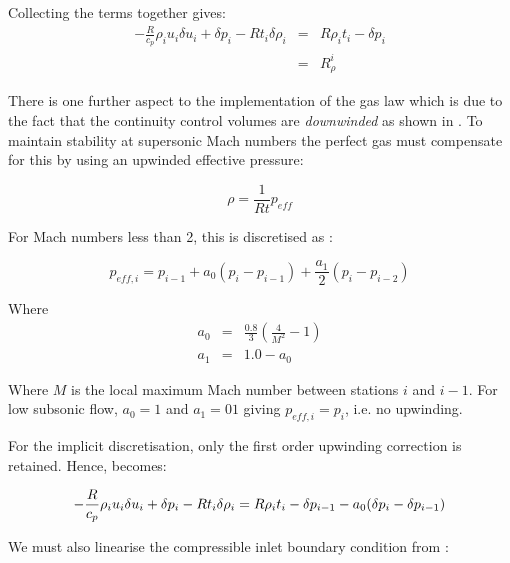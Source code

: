 Collecting the terms together gives:
\begin{equation}
  \begin{array}{rcl}
   -\frac{R}{c_p} \rho_i u_i \delta u_i + \delta p_i - Rt_i \delta \rho_i &=& R\rho_i t_i - \delta p_i \\[8pt]
      &=& R_{\rho}^i
  \end{array}
  \label{eqn-euler-1d-disc5}
\end{equation}

There is one further aspect to the implementation of the gas law which is due to the fact
that the continuity control volumes are {\it downwinded} as shown in .
To maintain stability at supersonic Mach numbers the perfect gas must compensate for this by
using an upwinded effective pressure:

\begin{equation}
    \rho = \frac{1}{Rt} p_{eff}
  \label{eqn-peff1}
\end{equation}

For Mach numbers less than 2, this is discretised as \cite{gupta1993development}:

\begin{equation}
   p_{eff,i} = p_{i-1} + a_0(p_i - p_{i-1}) + \frac{a_1}{2} (p_i - p_{i-2})
  \label{eqn-peff2}
\end{equation}

Where
\begin{equation}
  \begin{array}{rcl}
    a_0 &=& \frac{0.8}{3} (\frac{4}{M^2} - 1) \\[8pt]
    a_1 &=& 1.0 - a_0
  \end{array}
  \label{eqn-peff3}
\end{equation}

Where $M$ is the local maximum Mach number between stations $i$ and $i-1$.
For low subsonic flow, $a_0=1$ and $a_1 = 01$ giving $p_{eff,i} = p_i$, i.e. no upwinding.

For the implicit discretisation, only the first order upwinding correction is retained.
Hence,  becomes:

\begin{equation}
   -\frac{R}{c_p} \rho_i u_i \delta u_i + \delta p_i - Rt_i \delta \rho_i = 
    R\rho_i t_i - \delta p_{i-1} - a_0(\delta p_i - \delta p_{i-1}) \\
  \label{eqn-euler-1d-disc6}
\end{equation}

We must also linearise the compressible inlet boundary condition from :

